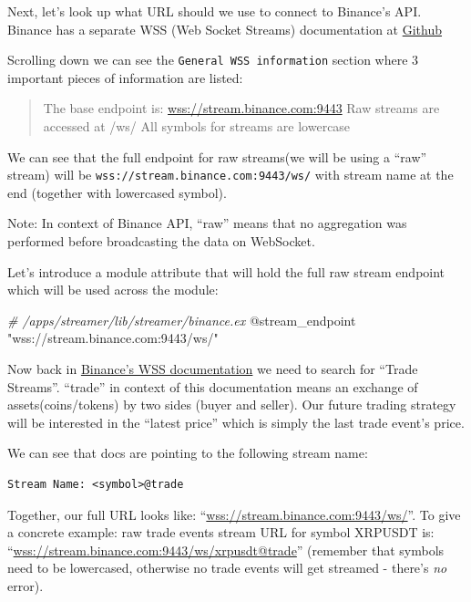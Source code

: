 \documentclass[
  oneside]{book}
\newenvironment{Shaded}{\begin{snugshade}}{\end{snugshade}}
\newcommand{\CommentTok}[1]{\textcolor[rgb]{0.56,0.35,0.01}{\textit{#1}}}
\newcommand{\OtherTok}[1]{\textcolor[rgb]{0.56,0.35,0.01}{#1}}
\newcommand{\StringTok}[1]{\textcolor[rgb]{0.31,0.60,0.02}{#1}}
\begin{document}
Next, let's look up what URL should we use to connect to Binance's API. Binance has a separate WSS (Web Socket Streams) documentation at \href{https://github.com/binance/binance-spot-api-docs/blob/master/web-socket-streams.md}{Github}

Scrolling down we can see the \texttt{General\ WSS\ information} section where 3 important pieces of information are listed:

\begin{quote}
The base endpoint is: \url{wss://stream.binance.com:9443}
Raw streams are accessed at /ws/
All symbols for streams are lowercase
\end{quote}

We can see that the full endpoint for raw streams(we will be using a ``raw'' stream) will be \texttt{wss://stream.binance.com:9443/ws/} with stream name at the end (together with lowercased symbol).

Note: In context of Binance API, ``raw'' means that no aggregation was performed before broadcasting the data on WebSocket.

Let's introduce a module attribute that will hold the full raw stream endpoint which will be used across the module:

\begin{Shaded}
\begin{Highlighting}[]
\CommentTok{\# /apps/streamer/lib/streamer/binance.ex}
\OtherTok{@stream\_endpoint} \StringTok{"wss://stream.binance.com:9443/ws/"}
\end{Highlighting}
\end{Shaded}

Now back in \href{https://github.com/binance/binance-spot-api-docs/blob/master/web-socket-streams.md}{Binance's WSS documentation} we need to search for ``Trade Streams''. ``trade'' in context of this documentation means an exchange of assets(coins/tokens) by two sides (buyer and seller). Our future trading strategy will be interested in the ``latest price'' which is simply the last trade event's price.

We can see that docs are pointing to the following stream name:

\begin{verbatim}
Stream Name: <symbol>@trade
\end{verbatim}

Together, our full URL looks like: ``\url{wss://stream.binance.com:9443/ws/}\citet{trade}''.
To give a concrete example: raw trade events stream URL for symbol XRPUSDT is:
``\url{wss://stream.binance.com:9443/ws/xrpusdt@trade}'' (remember that symbols need to be lowercased, otherwise no trade events will get streamed - there's \emph{no} error).
\end{document}
